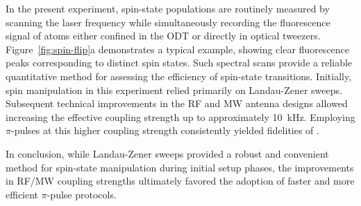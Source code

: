 In the present experiment, spin-state populations are routinely measured by scanning the laser frequency while simultaneously recording the fluorescence signal of atoms either confined in the ODT or directly in optical tweezers. Figure~\ref{fig:spin-flip}a demonstrates a typical example, showing clear fluorescence peaks corresponding to distinct spin states. Such spectral scans provide a reliable quantitative method for assessing the efficiency of spin-state transitions.
% 
Initially, spin manipulation in this experiment relied primarily on Landau-Zener sweeps. 
Subsequent technical improvements in the RF and MW antenna designs allowed increasing the effective coupling strength up to approximately 10~kHz. Employing $\pi$-pulses at this higher coupling strength consistently yielded fidelities of .

In conclusion, while Landau-Zener sweeps provided a robust and convenient method for spin-state manipulation during initial setup phases, the improvements in RF/MW coupling strengths ultimately favored the adoption of faster and more efficient $\pi$-pulse protocols.